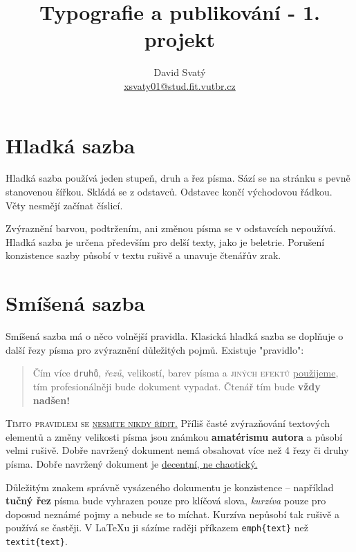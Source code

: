 \documentclass[hidelinks, twocolumn, a4paper]{article}
\title{Typografie a publikování - 1. projekt}
\author{David Svatý \\ \href{mailto:xsvaty01@stud.fit.vutbr.cz}{xsvaty01@stud.fit.vutbr.cz}}
\date{}
\begin{document}
\maketitle

\section{Hladká sazba}
\label{sec1}

Hladká sazba používá jeden stupeň, druh a řez písma.
Sází se na stránku s pevně stanovenou šířkou.
Skládá se z odstavců. Odstavec končí východovou řádkou.
Věty nesmějí začínat číslicí.

Zvýraznění barvou, podtržením, ani změnou písma se v odstavcích nepoužívá.
Hladká sazba je určena především pro delší texty, jako je beletrie.
Porušení konzistence sazby působí v textu rušivě a unavuje čtenářův zrak.

\section{Smíšená sazba}
\label{sec2}

Smíšená sazba má o něco volnější pravidla.
Klasická hladká sazba se doplňuje o další řezy písma pro zvýraznění důležitých pojmů.
Existuje "pravidlo": 

\begin{quotation}
    Čím více \verb|druhů|, {\itshape řezů}, {\tiny velikostí}, {\color{green} barev} písma a {\color{blue} \scshape jiných efektů} \underline{použijeme}, {\color{red} tím profesionálněji} bude {\selectfont dokument} vypadat.
    Čtenář tím bude {\Huge \bfseries vždy nadšen!}
\end{quotation}

{\scshape Tímto pravidlem se \underline{nesmíte nikdy řídit.}}
Příliš časté zvýrazňování textových elementů a změny {\tiny velikosti} písma jsou známkou {\bfseries amatérismu autora} a působí {\selectfont velmi rušivě.}
Dobře navržený dokument nemá obsahovat více než 4 řezy či druhy písma.
Dobře navržený dokument je \underline{decentní, ne chaotický.}

Důležitým znakem správně vysázeného dokumentu je konzistence -- například {\bfseries tučný řez} písma bude vyhrazen pouze pro klíčová slova, {\itshape kurzíva} pouze pro doposud neznámé pojmy a nebude se to míchat.
Kurzíva nepůsobí tak rušivě a používá se častěji.
V \LaTeX u ji sázíme raději příkazem \verb|emph{text}| než \verb|textit{text}|.
\end{document}
